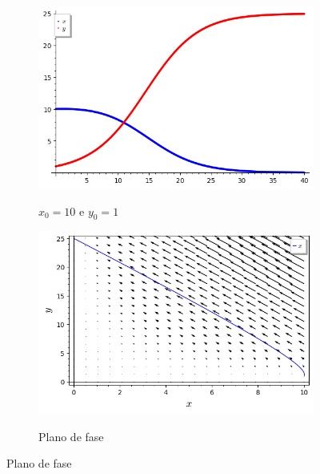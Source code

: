 \begin{figure}[H]
    \centering
    \begin{subfigure}{0.4\textwidth}
        \includegraphics[scale=0.48]{figuras/LV_9.png}
        \label{fig:LV_9}
        \caption{$x_0 = 10$ e $y_0 = 1$}
    \end{subfigure}
    \begin{subfigure}{0.4\textwidth}
        \includegraphics[scale=0.48]{figuras/LV_10.png}
        \label{fig:LV_10}
        \caption{Plano de fase}
    \end{subfigure}
\end{figure}

